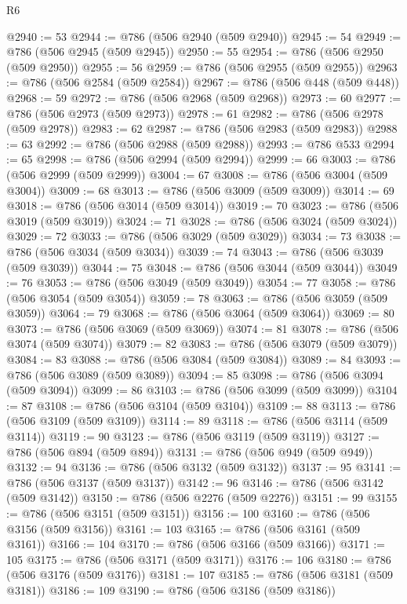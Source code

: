 \begin{lexlean}{R6}
\begin{coremodule}
@2940 := 53
@2944 := @786 (@506 @2940 (@509 @2940))
@2945 := 54
@2949 := @786 (@506 @2945 (@509 @2945))
@2950 := 55
@2954 := @786 (@506 @2950 (@509 @2950))
@2955 := 56
@2959 := @786 (@506 @2955 (@509 @2955))
@2963 := @786 (@506 @2584 (@509 @2584))
@2967 := @786 (@506 @448 (@509 @448))
@2968 := 59
@2972 := @786 (@506 @2968 (@509 @2968))
@2973 := 60
@2977 := @786 (@506 @2973 (@509 @2973))
@2978 := 61
@2982 := @786 (@506 @2978 (@509 @2978))
@2983 := 62
@2987 := @786 (@506 @2983 (@509 @2983))
@2988 := 63
@2992 := @786 (@506 @2988 (@509 @2988))
@2993 := @786 @533
@2994 := 65
@2998 := @786 (@506 @2994 (@509 @2994))
@2999 := 66
@3003 := @786 (@506 @2999 (@509 @2999))
@3004 := 67
@3008 := @786 (@506 @3004 (@509 @3004))
@3009 := 68
@3013 := @786 (@506 @3009 (@509 @3009))
@3014 := 69
@3018 := @786 (@506 @3014 (@509 @3014))
@3019 := 70
@3023 := @786 (@506 @3019 (@509 @3019))
@3024 := 71
@3028 := @786 (@506 @3024 (@509 @3024))
@3029 := 72
@3033 := @786 (@506 @3029 (@509 @3029))
@3034 := 73
@3038 := @786 (@506 @3034 (@509 @3034))
@3039 := 74
@3043 := @786 (@506 @3039 (@509 @3039))
@3044 := 75
@3048 := @786 (@506 @3044 (@509 @3044))
@3049 := 76
@3053 := @786 (@506 @3049 (@509 @3049))
@3054 := 77
@3058 := @786 (@506 @3054 (@509 @3054))
@3059 := 78
@3063 := @786 (@506 @3059 (@509 @3059))
@3064 := 79
@3068 := @786 (@506 @3064 (@509 @3064))
@3069 := 80
@3073 := @786 (@506 @3069 (@509 @3069))
@3074 := 81
@3078 := @786 (@506 @3074 (@509 @3074))
@3079 := 82
@3083 := @786 (@506 @3079 (@509 @3079))
@3084 := 83
@3088 := @786 (@506 @3084 (@509 @3084))
@3089 := 84
@3093 := @786 (@506 @3089 (@509 @3089))
@3094 := 85
@3098 := @786 (@506 @3094 (@509 @3094))
@3099 := 86
@3103 := @786 (@506 @3099 (@509 @3099))
@3104 := 87
@3108 := @786 (@506 @3104 (@509 @3104))
@3109 := 88
@3113 := @786 (@506 @3109 (@509 @3109))
@3114 := 89
@3118 := @786 (@506 @3114 (@509 @3114))
@3119 := 90
@3123 := @786 (@506 @3119 (@509 @3119))
@3127 := @786 (@506 @894 (@509 @894))
@3131 := @786 (@506 @949 (@509 @949))
@3132 := 94
@3136 := @786 (@506 @3132 (@509 @3132))
@3137 := 95
@3141 := @786 (@506 @3137 (@509 @3137))
@3142 := 96
@3146 := @786 (@506 @3142 (@509 @3142))
@3150 := @786 (@506 @2276 (@509 @2276))
@3151 := 99
@3155 := @786 (@506 @3151 (@509 @3151))
@3156 := 100
@3160 := @786 (@506 @3156 (@509 @3156))
@3161 := 103
@3165 := @786 (@506 @3161 (@509 @3161))
@3166 := 104
@3170 := @786 (@506 @3166 (@509 @3166))
@3171 := 105
@3175 := @786 (@506 @3171 (@509 @3171))
@3176 := 106
@3180 := @786 (@506 @3176 (@509 @3176))
@3181 := 107
@3185 := @786 (@506 @3181 (@509 @3181))
@3186 := 109
@3190 := @786 (@506 @3186 (@509 @3186))

\end{coremodule}
\end{lexlean}
